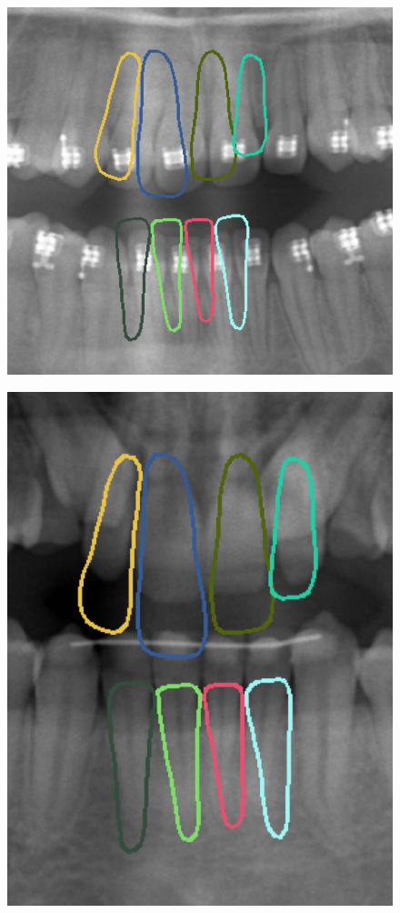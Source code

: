 \documentclass[11pt]{article}
\begin{document}
\begin{figure}[H]
\centering
\begin{minipage}{.5\textwidth}
  \centering
  \captionsetup{justification=centering}
  \includegraphics[width=\linewidth]{auto1}
  \label{fig:auto1}
\end{minipage}%
\hspace*{4Mm}
\begin{minipage}{.5\textwidth}
  \centering
  \captionsetup{justification=centering}
  \includegraphics[width=\linewidth]{auto2}

\end{minipage}
\end{figure}
\end{document}
